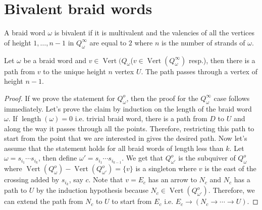 \section{Bivalent braid words}                          
\begin{definition}
	 A braid word $\omega$ is bivalent if it is multivalent and the valencies of all the vertices of height $1,\dots,n-1$ in $Q_\omega^\infty$ are equal to $2$ where $n$ is the number of strands of $\omega$. 
\end{definition}
\begin{lemma}\label{quoted6}
Let $\omega$ be a braid word and $v\in \operatorname{Vert}(Q_\omega$($v\in \operatorname{Vert}(Q_\omega^\infty)$ resp.), then there is a path from $v$ to the unique height $n$ vertex $U$. The path passes through a vertex of height $n-1$.
\end{lemma}
\begin{proof}
If we prove the statement for $Q^o_\omega$, then the proof for the $Q_\omega^\infty$ case follows immediately. Let's prove the claim by induction on the length of the braid word $\omega$. If $\operatorname{length}(\omega) = 0$ i.e. trivial braid word, there is a path from $D$ to $U$ and along the way it passes through all the points. Therefore, restricting this path to start from the point that we are interested in gives the desired path. Now let's assume that the statement holds for all braid words of length less than $k$. Let $\omega = s_{i_1}\cdots s_{i_k}$, then define $\omega' = s_{i_1}\cdots s_{i_{k-1}}$. We get that $Q^o_{\omega'}$ is the subquiver of $Q^o_\omega$ where $\operatorname{Vert}(Q^o_\omega) - \operatorname{Vert}(Q^o_{\omega'}) = \{v\}$ is a singleton where $v$ is the east of the crossing added by $s_{i_k}$, say $c$. Note that $v=E_c$ has an arrow to $N_c$ and $N_c$ has a path to $U$ by the induction hypothesis because $N_c \in \operatorname{Vert}(Q^o_{\omega'})$. Therefore, we can extend the path from $N_c$ to $U$ to start from $E_c$ i.e. $E_c\rightarrow (N_c\rightarrow \cdots \rightarrow U)$.
\end{proof}

